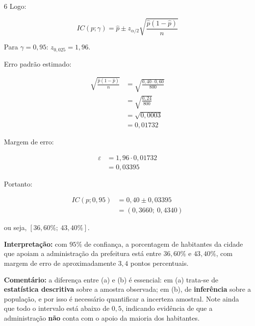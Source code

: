 \documentclass[8pt, a4paper, landscape]{extarticle}
\begin{document}
\begin{multicols}{6}
Logo:

\begin{equation*}
IC(p;\gamma) = \hat{p} \pm z_{\alpha/2}\sqrt{\frac{\hat{p}(1-\hat{p})}{n}}
\end{equation*}

Para $\gamma = 0,95$: $z_{0,025} = 1,96$.

Erro padrão estimado:

\begin{equation*}
\begin{split}
\sqrt{\frac{\hat{p}(1-\hat{p})}{n}} &= \sqrt{\frac{0,40 \cdot 0,60}{800}} \\
&= \sqrt{\frac{0,24}{800}} \\
&= \sqrt{0,0003} \\
&= 0,01732
\end{split}
\end{equation*}

Margem de erro:

\begin{equation*}
\begin{split}
\varepsilon &= 1,96 \cdot 0,01732 \\
&= 0,03395
\end{split}
\end{equation*}

Portanto:

\begin{equation*}
\begin{split}
IC(p;0,95) &= 0,40 \pm 0,03395 \\
&= (0,3660;\ 0,4340)
\end{split}
\end{equation*}

ou seja, $[36,60\%;\ 43,40\%]$.

\textbf{Interpretação:} com $95\%$ de confiança, a porcentagem de habitantes da cidade que apoiam a administração da prefeitura está entre $36,60\%$ e $43,40\%$, com margem de erro de aproximadamente $3,4$ pontos percentuais.

\vspace{0.2cm}

\textbf{Comentário:} a diferença entre (a) e (b) é essencial: em (a) trata-se de \textbf{estatística descritiva} sobre a amostra observada; em (b), de \textbf{inferência} sobre a população, e por isso é necessário quantificar a incerteza amostral. Note ainda que todo o intervalo está abaixo de $0,5$, indicando evidência de que a administração \textbf{não} conta com o apoio da maioria dos habitantes.


\end{multicols}
\end{document}
